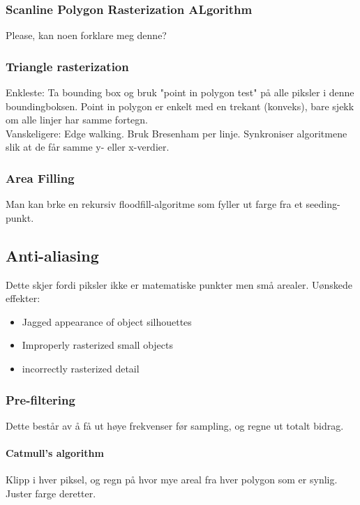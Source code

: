 \subsubsection{Scanline Polygon Rasterization ALgorithm}
Please, kan noen forklare meg denne?

\subsubsection{Triangle rasterization}
Enkleste: Ta bounding box og bruk "point in polygon test" på alle piksler i denne boundingboksen. Point in polygon er enkelt med en trekant (konveks), bare sjekk om alle linjer har samme fortegn. \\
Vanskeligere: Edge walking. Bruk Bresenham per linje. Synkroniser algoritmene slik at de får samme y- eller x-verdier.

\subsubsection{Area Filling}
Man kan brke en rekursiv floodfill-algoritme som fyller ut farge fra et seeding-punkt.
    
\subsection{Anti-aliasing}
Dette skjer fordi piksler ikke er matematiske punkter men små arealer. Uønskede effekter:
\begin{itemize}
\item Jagged appearance of object silhouettes
\item Improperly rasterized small objects
\item incorrectly rasterized detail
\end{itemize}
\subsubsection{Pre-filtering}
Dette består av å få ut høye frekvenser før sampling, og regne ut totalt bidrag.

\paragraph{Catmull's algorithm}
Klipp i hver piksel, og regn på hvor mye areal fra hver polygon som er synlig. Juster farge deretter.

